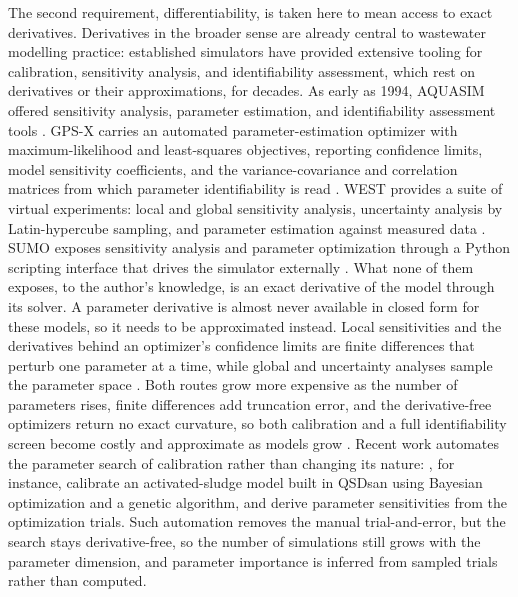 \documentclass{article}
\begin{document}
The second requirement, differentiability, is taken here to mean access to exact derivatives. Derivatives in the broader sense are already central to wastewater modelling practice: established simulators have provided extensive tooling for calibration, sensitivity analysis, and identifiability assessment, which rest on derivatives or their approximations, for decades. As early as 1994, AQUASIM offered sensitivity analysis, parameter estimation, and identifiability assessment tools \citep{reichert1994}. GPS-X carries an automated parameter-estimation optimizer with maximum-likelihood and least-squares objectives, reporting confidence limits, model sensitivity coefficients, and the variance-covariance and correlation matrices from which parameter identifiability is read \citep{gpsx}. WEST provides a suite of virtual experiments: local and global sensitivity analysis, uncertainty analysis by Latin-hypercube sampling, and parameter estimation against measured data \citep{westuserguides}. SUMO exposes sensitivity analysis and parameter optimization through a Python scripting interface that drives the simulator externally \citep{sumodoc}. What none of them exposes, to the author's knowledge, is an exact derivative of the model through its solver. A parameter derivative is almost never available in closed form for these models, so it needs to be approximated instead. Local sensitivities and the derivatives behind an optimizer's confidence limits are finite differences that perturb one parameter at a time, while global and uncertainty analyses sample the parameter space \citep{gpsx, westuserguides}. Both routes grow more expensive as the number of parameters rises, finite differences add truncation error, and the derivative-free optimizers return no exact curvature, so both calibration and a full identifiability screen become costly and approximate as models grow \citep{vanrolleghem1995, brun2001}. Recent work automates the parameter search of calibration rather than changing its nature: \citet{yu2025}, for instance, calibrate an activated-sludge model built in QSDsan using Bayesian optimization and a genetic algorithm, and derive parameter sensitivities from the optimization trials. Such automation removes the manual trial-and-error, but the search stays derivative-free, so the number of simulations still grows with the parameter dimension, and parameter importance is inferred from sampled trials rather than computed.
\end{document}
